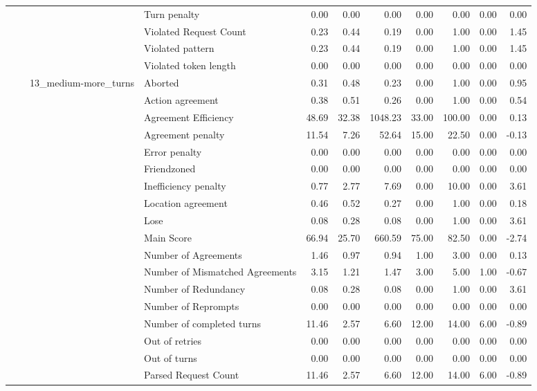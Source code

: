 \begin{tabular}{llllrrrrrrr}
 &  &  & Turn penalty & 0.00 & 0.00 & 0.00 & 0.00 & 0.00 & 0.00 & 0.00 \\
 &  &  & Violated Request Count & 0.23 & 0.44 & 0.19 & 0.00 & 1.00 & 0.00 & 1.45 \\
 &  &  & Violated pattern & 0.23 & 0.44 & 0.19 & 0.00 & 1.00 & 0.00 & 1.45 \\
 &  &  & Violated token length & 0.00 & 0.00 & 0.00 & 0.00 & 0.00 & 0.00 & 0.00 \\
\cline{3-11}
 &  & \multirow[t]{27}{*}{13_medium-more_turns} & Aborted & 0.31 & 0.48 & 0.23 & 0.00 & 1.00 & 0.00 & 0.95 \\
 &  &  & Action agreement & 0.38 & 0.51 & 0.26 & 0.00 & 1.00 & 0.00 & 0.54 \\
 &  &  & Agreement Efficiency & 48.69 & 32.38 & 1048.23 & 33.00 & 100.00 & 0.00 & 0.13 \\
 &  &  & Agreement penalty & 11.54 & 7.26 & 52.64 & 15.00 & 22.50 & 0.00 & -0.13 \\
 &  &  & Error penalty & 0.00 & 0.00 & 0.00 & 0.00 & 0.00 & 0.00 & 0.00 \\
 &  &  & Friendzoned & 0.00 & 0.00 & 0.00 & 0.00 & 0.00 & 0.00 & 0.00 \\
 &  &  & Inefficiency penalty & 0.77 & 2.77 & 7.69 & 0.00 & 10.00 & 0.00 & 3.61 \\
 &  &  & Location agreement & 0.46 & 0.52 & 0.27 & 0.00 & 1.00 & 0.00 & 0.18 \\
 &  &  & Lose & 0.08 & 0.28 & 0.08 & 0.00 & 1.00 & 0.00 & 3.61 \\
 &  &  & Main Score & 66.94 & 25.70 & 660.59 & 75.00 & 82.50 & 0.00 & -2.74 \\
 &  &  & Number of Agreements & 1.46 & 0.97 & 0.94 & 1.00 & 3.00 & 0.00 & 0.13 \\
 &  &  & Number of Mismatched Agreements & 3.15 & 1.21 & 1.47 & 3.00 & 5.00 & 1.00 & -0.67 \\
 &  &  & Number of Redundancy & 0.08 & 0.28 & 0.08 & 0.00 & 1.00 & 0.00 & 3.61 \\
 &  &  & Number of Reprompts & 0.00 & 0.00 & 0.00 & 0.00 & 0.00 & 0.00 & 0.00 \\
 &  &  & Number of completed turns & 11.46 & 2.57 & 6.60 & 12.00 & 14.00 & 6.00 & -0.89 \\
 &  &  & Out of retries & 0.00 & 0.00 & 0.00 & 0.00 & 0.00 & 0.00 & 0.00 \\
 &  &  & Out of turns & 0.00 & 0.00 & 0.00 & 0.00 & 0.00 & 0.00 & 0.00 \\
 &  &  & Parsed Request Count & 11.46 & 2.57 & 6.60 & 12.00 & 14.00 & 6.00 & -0.89 \\

\end{tabular}
